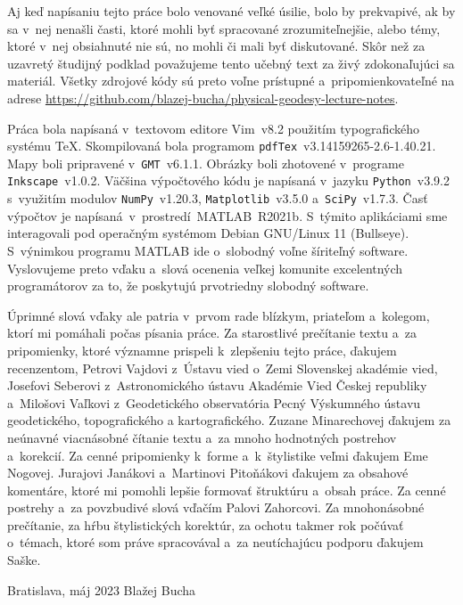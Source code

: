 \documentclass[a4paper, 12pt]{book}
\begin{document}
Aj keď napísaniu tejto práce bolo venované veľké úsilie, bolo by prekvapivé, ak 
by sa v~nej nenašli časti, ktoré mohli byť spracované zrozumiteľnejšie, alebo 
témy, ktoré v~nej obsiahnuté nie sú, no mohli či mali byť diskutované.  Skôr 
než za uzavretý študijný podklad považujeme tento učebný text za živý 
zdokonaľujúci sa materiál.  Všetky zdrojové kódy sú preto voľne prístupné 
a~pripomienkovateľné na adrese 
\url{https://github.com/blazej-bucha/physical-geodesy-lecture-notes}.

Práca bola napísaná v~textovom editore Vim~v8.2 použitím typografického systému
\TeX.  Skompilovaná bola programom \texttt{pdfTex}~v3.14159265-2.6-1.40.21.
Mapy boli pripravené v~\texttt{GMT}~v6.1.1.  Obrázky boli zhotovené v~programe
\texttt{Inkscape}~v1.0.2.  Väčšina výpočtového kódu je napísaná
v~jazyku \texttt{Python}~v3.9.2 s~využitím modulov
\texttt{NumPy}~v1.20.3, \texttt{Matplotlib}~v3.5.0 a~\texttt{SciPy}~v1.7.3.
Časť výpočtov je napísaná~v~prostredí~MATLAB~R2021b.
S~týmito aplikáciami sme interagovali pod operačným systémom Debian GNU/Linux
11 (Bullseye).  S~výnimkou programu MATLAB ide o~slobodný voľne šíriteľný
software.  Vyslovujeme preto vďaku a~slová ocenenia veľkej komunite
excelentných programátorov za to, že poskytujú prvotriedny slobodný software.

Úprimné slová vďaky ale patria v~prvom rade blízkym, priateľom a~kolegom, ktorí 
mi pomáhali počas písania práce.  Za starostlivé prečítanie textu a~za 
pripomienky, ktoré významne prispeli k~zlepšeniu tejto práce, ďakujem 
recenzentom, Petrovi Vajdovi z~Ústavu vied o~Zemi Slovenskej akadémie vied, 
Josefovi Seberovi z~Astronomického ústavu Akadémie Vied Českej republiky 
a~Milošovi Vaľkovi z~Geodetického observatória Pecný Výskumného ústavu 
geodetického, topografického a kartografického.  Zuzane Minarechovej ďakujem za 
neúnavné viacnásobné čítanie textu a~za mnoho hodnotných postrehov a~korekcií.  
Za cenné pripomienky k~forme a~k~štylistike veľmi ďakujem Eme Nogovej.  
Jurajovi Janákovi a~Martinovi Pitoňákovi ďakujem za obsahové komentáre, ktoré 
mi pomohli lepšie formovať štruktúru a~obsah práce.  Za cenné postrehy a~za 
povzbudivé slová vďačím Palovi Zahorcovi.  Za mnohonásobné prečítanie, za hŕbu 
štylistických korektúr, za ochotu takmer rok počúvať o~témach, ktoré som práve 
spracovával a~za neutíchajúcu podporu ďakujem Saške.


\vspace{4ex}

\noindent Bratislava, máj 2023 \hfill Blažej Bucha
\end{document}
